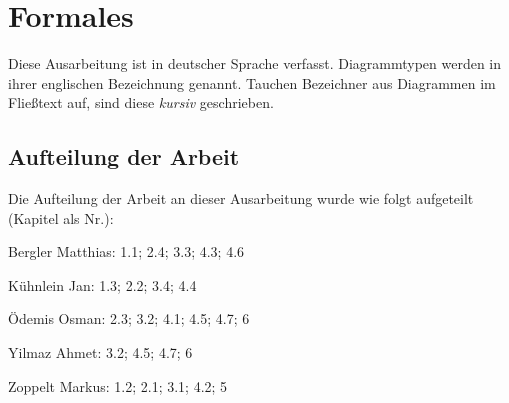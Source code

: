 \chapter*{Formales}

Diese Ausarbeitung ist in deutscher Sprache verfasst. Diagrammtypen werden in ihrer englischen Bezeichnung genannt. Tauchen Bezeichner aus Diagrammen im Fließtext auf, sind diese \emph{kursiv} geschrieben.

\section*{Aufteilung der Arbeit}
Die Aufteilung der Arbeit an dieser Ausarbeitung wurde wie folgt aufgeteilt (Kapitel als Nr.):

Bergler Matthias: 1.1; 2.4; 3.3; 4.3; 4.6

Kühnlein Jan: 1.3; 2.2; 3.4; 4.4

Ödemis Osman: 2.3; 3.2; 4.1; 4.5; 4.7; 6

Yilmaz Ahmet: 3.2; 4.5; 4.7; 6

Zoppelt Markus: 1.2; 2.1; 3.1; 4.2; 5
